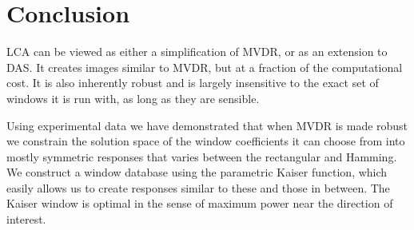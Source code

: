 \documentclass[10pt,journal,draftclsnofoot,onecolumn]{IEEEtran}
\newcommand\Fig[1]{Fig.~\ref{#1}}
\newcommand\1{\vec 1}
\begin{document}
% 
% 


\section{Conclusion}

LCA can be viewed as either a simplification of MVDR, or as an extension to DAS. It creates images similar to MVDR, but at a fraction of the computational cost. It is also inherently robust and is largely insensitive to the exact set of windows it is run with, as long as they are sensible.

Using experimental data we have demonstrated that when MVDR is made robust we constrain the solution space of the window coefficients it can choose from into mostly symmetric responses that varies between the rectangular and Hamming. We construct a window database using the parametric Kaiser function, which easily allows us to create responses similar to these and those in between. The Kaiser window is optimal in the sense of maximum power near the direction of interest.

% 
% 


% 
% 
\end{document}
